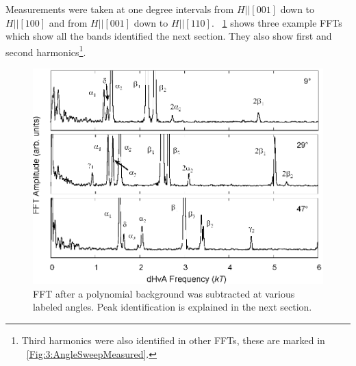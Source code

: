 Measurements were taken at one degree intervals from $H || [001]$ down to $H || [100]$ and from $H || [001]$ down to $H || [110]$. \Fig~\ref{Fig:3:FFTExamples} shows three example FFTs which show all the bands identified the next section. They also show first and second harmonics\footnote{Third harmonics were also identified in other FFTs, these are marked in \fig~\ref{Fig:3:AngleSweepMeasured}.}.
\begin{figure}[h!]
    \begin{center}
        \includegraphics[scale=0.7]{Chapter3-dHvABaFe2P2/Figures/AngleDepMeasurements/FFTExamples/FFTExamples}
        \caption{FFT after a polynomial background was subtracted at various labeled angles. Peak identification is explained in the next section.}
        \label{Fig:3:FFTExamples}
    \end{center}
\end{figure}

